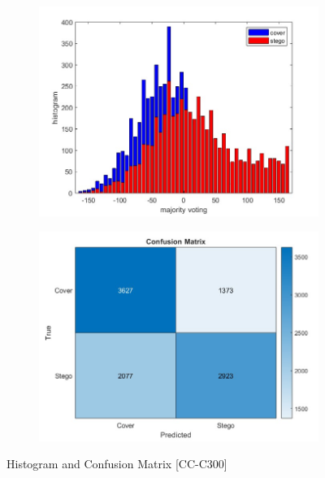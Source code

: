\begin{figure}[H]
    \begin{subfigure}[b]{0.5\textwidth}
        \includegraphics[width=\textwidth]{img/histo300.jpg}
    \end{subfigure}
    \hfill
    \begin{subfigure}[b]{0.5\textwidth}
        \includegraphics[width=\textwidth]{img/confusion300.jpg}
    \end{subfigure}
    \caption{Histogram and Confusion Matrix [CC-C300]}
\end{figure}
\clearpage
